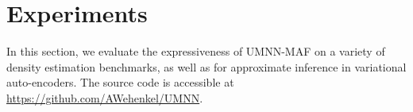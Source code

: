 



\section{Experiments}

In this section, we evaluate the expressiveness of UMNN-MAF on a variety of density estimation benchmarks, as well as for approximate inference in variational auto-encoders.
The source code is accessible at \url{https://github.com/AWehenkel/UMNN}.

